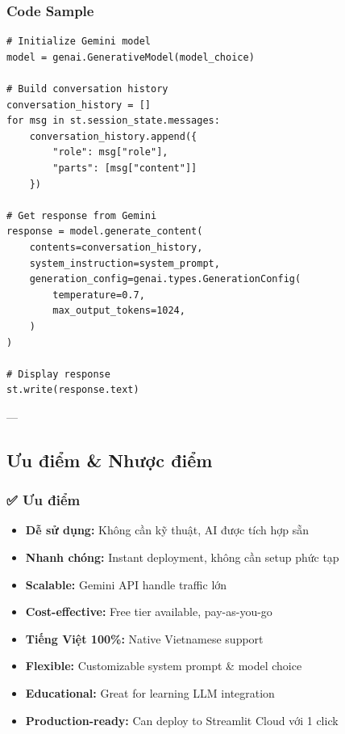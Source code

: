 \documentclass[12pt,a4paper]{article}
\begin{document}
\subsubsection{Code Sample}

\begin{lstlisting}
# Initialize Gemini model
model = genai.GenerativeModel(model_choice)

# Build conversation history
conversation_history = []
for msg in st.session_state.messages:
    conversation_history.append({
        "role": msg["role"],
        "parts": [msg["content"]]
    })

# Get response from Gemini
response = model.generate_content(
    contents=conversation_history,
    system_instruction=system_prompt,
    generation_config=genai.types.GenerationConfig(
        temperature=0.7,
        max_output_tokens=1024,
    )
)

# Display response
st.write(response.text)
\end{lstlisting}

---

\subsection{Ưu điểm \& Nhược điểm}

\subsubsection{✅ Ưu điểm}

\begin{itemize}
    \item \textbf{Dễ sử dụng:} Không cần kỹ thuật, AI được tích hợp sẵn
    \item \textbf{Nhanh chóng:} Instant deployment, không cần setup phức tạp
    \item \textbf{Scalable:} Gemini API handle traffic lớn
    \item \textbf{Cost-effective:} Free tier available, pay-as-you-go
    \item \textbf{Tiếng Việt 100\%:} Native Vietnamese support
    \item \textbf{Flexible:} Customizable system prompt \& model choice
    \item \textbf{Educational:} Great for learning LLM integration
    \item \textbf{Production-ready:} Can deploy to Streamlit Cloud với 1 click
\end{itemize}
\end{document}
